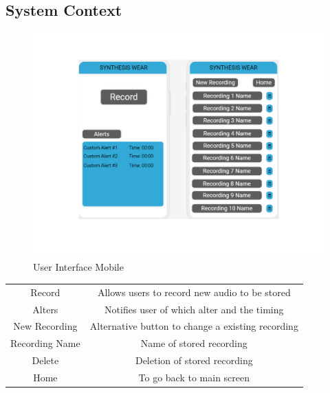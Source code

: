 \documentclass[12pt, titlepage]{article}
\begin{document}
\subsection {System Context}
\begin{figure}[H]
  \includegraphics[clip,trim= 0cm 5cm 0cm 2cm,width=\textwidth,height=\textheight,keepaspectratio]{UserInterface.pdf}
  \caption{User Interface Mobile}
  \label{User Interface} 
\end{figure}
\begin{center}
\begin{tabular}{c c}
Record & Allows users to record new audio to be stored \\
Alters & Notifies user of which alter and the timing \\
New Recording & Alternative button to change a existing recording \\
Recording Name & Name of stored recording \\
Delete & Deletion of stored recording \\
Home & To go back to main screen \\
\end{tabular}
\end{center}
\newpage
\end{document}
